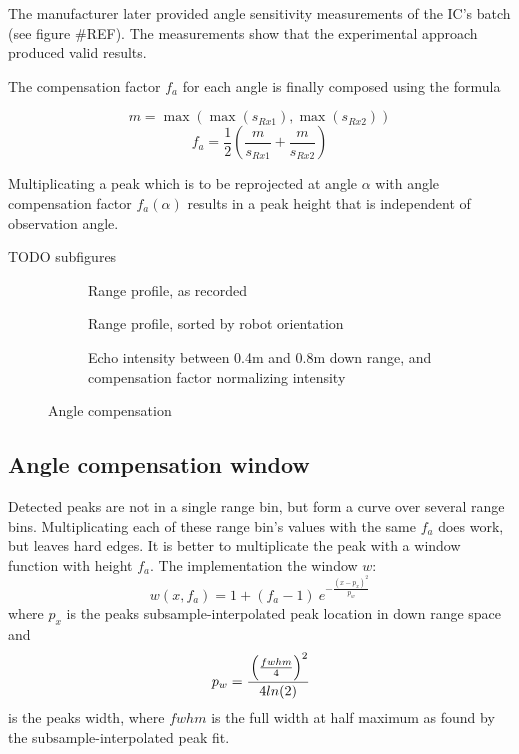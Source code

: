 The manufacturer later provided angle sensitivity measurements of the
IC's batch (see figure \#REF). The measurements show that the
experimental approach produced valid results.

The compensation factor \(f_a\) for each angle is finally composed using
the formula

\[m = \max \left( \max (s_{Rx1}), \max (s_{Rx2}) \right)\] \[
f_a = \frac{1}{2}
  \left(
    \frac{m}{ s_{Rx1} } +
    \frac{m}{ s_{Rx2} }
  \right)
\]

Multiplicating a peak which is to be reprojected at angle \(\alpha\)
with angle compensation factor \(f_a(\alpha)\) results in a peak height
that is independent of observation angle.

TODO subfigures
\begin{figure}[htp]
    \centering
    \label{fig:fig_angle_compensation}
    \begin{subfigure}{\textwidth}
        \centering
        \def\svgscale{0.8} \small
        
        \caption{Range profile, as recorded}
        \bigskip
    \end{subfigure}
    \begin{subfigure}{\textwidth}
        \centering
        \def\svgscale{0.8} \small
        
        \caption{Range profile, sorted by robot orientation}
        \bigskip
    \end{subfigure}
    \begin{subfigure}{\textwidth}
        \centering
        \def\svgscale{0.8} \small
        
        \caption{Echo intensity between 0.4m and 0.8m down range, and compensation factor normalizing intensity}
        \bigskip
    \end{subfigure}
    \caption{Angle compensation}
\end{figure}

\subsection{Angle compensation
window}\label{angle-compensation-window}

Detected peaks are not in a single range bin, but form a curve over
several range bins. Multiplicating each of these range bin's values with
the same \(f_a\) does work, but leaves hard edges. It is better to
multiplicate the peak with a window function with height \(f_a\). The
implementation the window \(w\): \[
w(x,f_a) = 1 + (f_a - 1)
~e ^ {
 -\frac{ \left( {x - p_x} \right) ^ 2 }
       {p_w}
}
\] where \(p_x\) is the peaks subsample-interpolated peak location in
down range space and
$$
p_w = \cfrac{
\left( \frac{fwhm}{4}  \right) ^2
}{
4 ln(2)}
$$ is
the peaks width, where \(fwhm\) is the full width at half maximum as
found by the subsample-interpolated peak fit.


